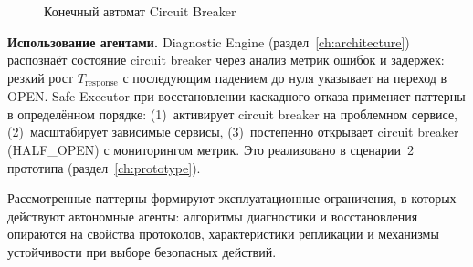 \begin{figure}[H]
\centering
{}
\caption{Конечный автомат Circuit Breaker}
\label{fig:circuit_breaker_fsm}
\end{figure}

\textbf{Использование агентами.} Diagnostic Engine (раздел~\ref{ch:architecture}) распознаёт состояние circuit breaker через анализ метрик ошибок и задержек: резкий рост $T_{\text{response}}$ с последующим падением до нуля указывает на переход в OPEN. Safe Executor при восстановлении каскадного отказа применяет паттерны в определённом порядке: (1)~активирует circuit breaker на проблемном сервисе, (2)~масштабирует зависимые сервисы, (3)~постепенно открывает circuit breaker (HALF\_OPEN) с мониторингом метрик. Это реализовано в сценарии~2 прототипа (раздел~\ref{ch:prototype}).

\medskip

Рассмотренные паттерны формируют эксплуатационные ограничения, в которых действуют автономные агенты: алгоритмы диагностики и восстановления опираются на свойства протоколов, характеристики репликации и механизмы устойчивости при выборе безопасных действий.
